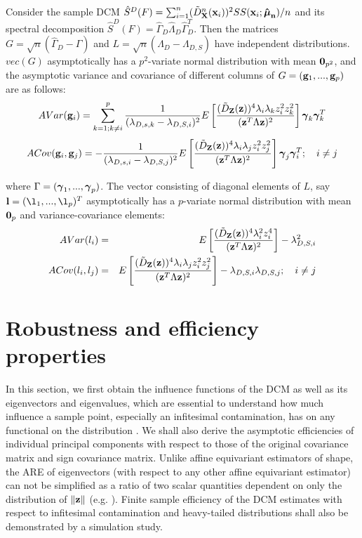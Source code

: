 \documentclass[fleqn,12pt]{article}
\begin{document}
\begin{Corollary} \label{Corollary:eigendist}
Consider the sample DCM $ \hat S^D(F) = \sum_{i=1}^n (\tilde D^n_{\mathbf{X}} ({\bf{x}}_i))^2 SS({\bf{x}}_i; {\bf \hat{{\boldsymbol{\mu}}}_n})/n $ and its spectral decomposition $\hat S^D(F) = \hat\Gamma_D \hat\Lambda_D \hat\Gamma_D^T $. Then the matrices $G = \sqrt n (\hat\Gamma_D - \Gamma) $ and $L = \sqrt n (\hat\Lambda_D - \Lambda_{D,S}) $ have independent distributions. $vec(G)$ asymptotically has a $p^2$-variate normal distribution with mean ${\bf 0}_{p^2}$, and the asymptotic variance and covariance of different columns of $G = ({\bf{g}}_1,...,{\bf{g}}_p)$ are as follows:
\begin{equation} \label{equation:DevEq}
AVar({\bf{g}}_i) = \sum_{k=1; k \neq i}^p \frac{1}{(\lambda_{D,s,k} - \lambda_{D,S,i})^2} E \left[ \frac{(\tilde D_{\mathbf{Z}} ({\bf{z}}))^4 \lambda_i \lambda_k z_i^2 z_k^2}{({\bf{z}}^T \Lambda {\bf{z}})^2} \right] {\boldsymbol{\gamma}}_k {\boldsymbol{\gamma}}_k^T
\end{equation}
\begin{equation}
ACov({\bf{g}}_i, {\bf{g}}_j) = - \frac{1}{(\lambda_{D,s,i} - \lambda_{D,S,j})^2} E \left[ \frac{(\tilde D_{\mathbf{Z}} ({\bf{z}}))^4 \lambda_i \lambda_j z_i^2 z_j^2}{({\bf{z}}^T \Lambda {\bf{z}})^2} \right] {\boldsymbol{\gamma}}_j {\boldsymbol{\gamma}}_i^T; \quad i \neq j
\end{equation}

where $\Gamma = ({\boldsymbol{\gamma}}_1,...,{\boldsymbol{\gamma}}_p)$. The vector consisting of diagonal elements of $L$, say $\bfl = (\l_1,...,\l_p)^T$ asymptotically has a $p$-variate normal distribution with mean ${\bf 0}_p$ and variance-covariance elements:
\begin{eqnarray}
AVar(l_i) &=& E \left[ \frac{(\tilde D_{\mathbf{Z}} ({\bf{z}}))^4 \lambda_i^2 z_i^4}{({\bf{z}}^T \Lambda {\bf{z}})^2} \right] - \lambda_{D,S,i}^2\\
ACov(l_i, l_j) &=& E \left[ \frac{(\tilde D_{\mathbf{Z}} ({\bf{z}}))^4 \lambda_i \lambda_j z_i^2 z_j^2}{({\bf{z}}^T \Lambda {\bf{z}})^2} \right] - \lambda_{D,S,i} \lambda_{D,S,j}; \quad i \neq j
\end{eqnarray}

\end{Corollary}

\section{Robustness and efficiency properties} \label{section:simSection}
In this section, we first obtain the influence functions of the DCM as well as its eigenvectors and eigenvalues, which are essential to understand how much influence a sample point, especially an infitesimal contamination, has on any functional on the distribution \citep{hampel}. We shall also derive the asymptotic efficiencies of individual principal components with respect to those of the original covariance matrix and sign covariance matrix. Unlike affine equivariant estimators of shape, the ARE of eigenvectors (with respect to any other affine equivariant estimator) can not be simplified as a ratio of two scalar quantities dependent on only the distribution of $\| {\bf{z}} \|$ (e.g. \cite{taskinen12,ollilia03}). Finite sample efficiency of the DCM estimates with respect to infitesimal contamination and heavy-tailed distributions shall also be demonstrated by a simulation study.
\end{document}
